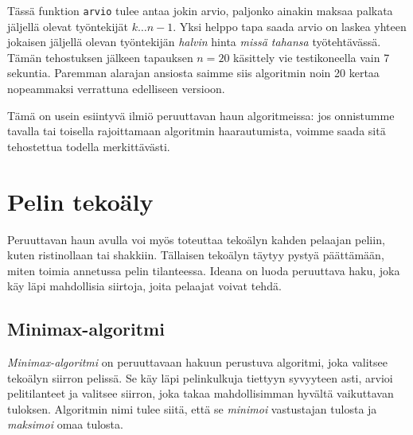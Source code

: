 Tässä funktion \texttt{arvio} tulee antaa jokin arvio,
paljonko ainakin maksaa palkata jäljellä olevat työntekijät $k \dots n-1$.
Yksi helppo tapa saada arvio on laskea yhteen jokaisen jäljellä olevan
työntekijän \emph{halvin} hinta \emph{missä tahansa} työtehtävässä.
Tämän tehostuksen jälkeen tapauksen $n=20$ käsittely vie
testikoneella vain 7 sekuntia.
Paremman alarajan ansiosta saimme siis algoritmin
noin 20 kertaa nopeammaksi verrattuna edelliseen versioon.

Tämä on usein esiintyvä ilmiö peruuttavan haun algoritmeissa:
jos onnistumme tavalla tai toisella rajoittamaan algoritmin
haarautumista, voimme saada sitä tehostettua todella merkittävästi.

\section{Pelin tekoäly}

Peruuttavan haun avulla voi myös toteuttaa tekoälyn kahden pelaajan peliin,
kuten ristinollaan tai shakkiin.
Tällaisen tekoälyn täytyy pystyä päättämään,
miten toimia annetussa pelin tilanteessa.
Ideana on luoda peruuttava haku, joka käy läpi mahdollisia siirtoja,
joita pelaajat voivat tehdä.

\subsection{Minimax-algoritmi}

\emph{Minimax-algoritmi} on peruuttavaan hakuun perustuva algoritmi,
joka valitsee tekoälyn siirron pelissä.
Se käy läpi pelinkulkuja tiettyyn syvyyteen asti,
arvioi pelitilanteet ja valitsee siirron,
joka takaa mahdollisimman hyvältä vaikuttavan tuloksen.
Algoritmin nimi tulee siitä, että se \emph{minimoi} vastustajan tulosta
ja \emph{maksimoi} omaa tulosta.


